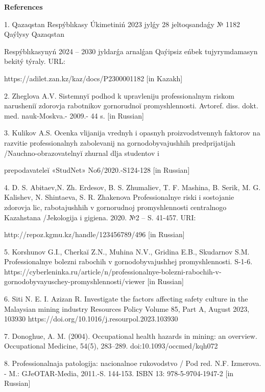 \begin{center}
{\bfseries References}
\end{center}

\begin{noparindent}
1. Qazaqstan Respýblıkasy Úkimetiniń 2023 jylǵy 28 jeltoqsandaǵy № 1182
Qaýlysy Qazaqstan

Respýblıkasynyń 2024 -- 2030 jyldarǵa arnalǵan
Qaýipsiz eńbek tujyrymdamasyn bekitý týraly. URL:

https://adilet.zan.kz/kaz/docs/P2300001182 {[}in Kazakh{]}

2. Zheglova A.V. Sistemnyĭ podhod k upravleniju
professional\textquotesingle nym riskom narusheniĭ
zdorov\textquotesingle ja rabotnikov gornorudnoĭ promyshlennosti.
Avtoref. diss. dokt. med. nauk-Moskva.- 2009.- 44 s. {[}in Russian{]}

3. Kulikov A.S. Ocenka vlijanija vrednyh i opasnyh proizvodstvennyh
faktorov na razvitie professional\textquotesingle nyh zabolevanij na
gornodobyvajushhih predprijatijah
/Nauchno-obrazovatel\textquotesingle nyĭ zhurnal dlja studentov i

prepodavateleĭ «StudNet» No6/2020.-S124-128 {[}in Russian{]}

4. D. S. Abitaev,N. Zh. Erdesov, B. S. Zhumaliev, T. F. Mashina, B.
Serik, M. G. Kalishev, N. Shintaeva, S. R. Zhakenova
Professional\textquotesingle nye riski i sostojanie
zdorov\textquotesingle ja lic, rabotajushhih v gornorudnoj
promyshlennosti central\textquotesingle nogo Kazahstana /Jekologija i
gigiena. 2020. №2 -- S. 41-457. URI:

http://repoz.kgmu.kz/handle/123456789/496 {[}in Russian{]}

5. Korshunov G.I., Cherkaĭ Z.N., Muhina N.V., Gridina E.B., Skudarnov
S.M. Professional\textquotesingle nye bolezni rabochih v
gornodobyvajushhej promyshlennosti. S-1-6.
https://cyberleninka.ru/article/n/professionalnye-bolezni-rabochih-v-gornodobyvayuschey-promyshlennosti/viewer
{[}in Russian{]}

6. Siti N. E. I. Azizan R. Investigate the factors affecting safety
culture in the Malaysian mining industry Resources Policy Volume 85,
Part A, August 2023, 103930
https://doi.org/10.1016/j.resourpol.2023.103930

7. Donoghue, A. M. (2004). Occupational health hazards in mining: an
overview. Occupational Medicine, 54(5), 283--289.
doi:10.1093/occmed/kqh072

8. Professional\textquotesingle naja patologija:
nacional\textquotesingle noe rukovodstvo / Pod red. N.F. Izmerova. - M.:
GJeOTAR-Media, 2011.-S. 144-153. ISBN 13: 978-5-9704-1947-2 {[}in
Russian{]}


\end{noparindent}
